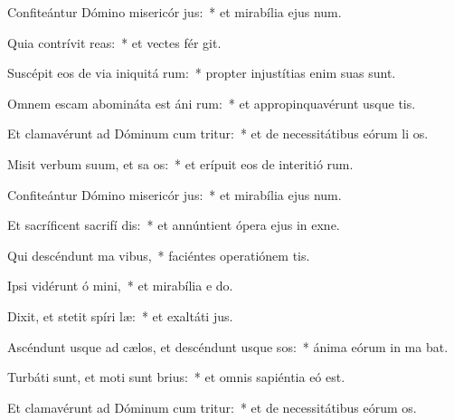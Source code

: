 \item Confiteántur Dómino misericór jus:~* et mirabília ejus  num.
\item Quia contrívit  reas:~* et vectes fér git.
\item Suscépit eos de via iniquitá rum:~* propter injustítias enim suas  sunt.
\item Omnem escam abomináta est áni rum:~* et appropinquavérunt usque   tis.
\item Et clamavérunt ad Dóminum cum tritur:~* et de necessitátibus eórum li os.
\item Misit verbum suum, et sa os:~* et erípuit eos de interitió rum.
\item Confiteántur Dómino misericór jus:~* et mirabília ejus  num.
\item Et sacríficent sacrifí dis:~* et annúntient ópera ejus in exne.
\item Qui descéndunt ma  vibus,~* faciéntes operatiónem   tis.
\item Ipsi vidérunt ó mini,~* et mirabília e  do.
\item Dixit, et stetit spíri læ:~* et exaltáti   jus.
\item Ascéndunt usque ad cælos, et descéndunt usque  sos:~* ánima eórum in ma bat.
\item Turbáti sunt, et moti sunt  brius:~* et omnis sapiéntia eó  est.
\item Et clamavérunt ad Dóminum cum tritur:~* et de necessitátibus eórum  os.

